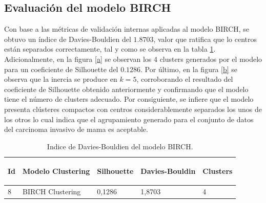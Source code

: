 \subsection{Evaluación del modelo BIRCH}
Con base a las métricas de validación internas aplicadas al modelo BIRCH, se obtuvo un índice de Davies-Bouldien del $1.8703$, valor que ratifica que lo centros están separados correctamente, tal y como se observa en la tabla \ref{Davies-Bouldien}. Adicionalmente, en la figura \ref{a} se observan los 4 clusters generados por el modelo para un coeficiente de Silhouette del $0.1286$. Por último, en la figura \ref{b} se observa que la inercia se produce en $k = 5 $, corroborando el resultado del coeficiente de Silhouette obtenido anteriormente y confirmando que el modelo tiene el número de clusters adecuado. Por consiguiente, se infiere que el modelo presenta clústeres compactos con centros considerablemente separados los unos de los otros lo cual indica que el agrupamiento generado para el conjunto de datos del carcinoma invasivo de mama es aceptable. 

\begin{table}[!htb]
	\footnotesize
	\centering
	\begin{threeparttable}
		\begin{tabular}{p{1cm} p{4cm} p{2.5cm} p{2.5cm} p{1.5cm}} \toprule	
			\begin{center}Id\end{center}
			&\begin{center}Modelo Clustering\end{center}
			&\begin{center}Silhouette\end{center}
			&\begin{center}Davies-Bouldin\end{center}
			&\begin{center}Clusters\end{center}
			\\ \hline 8 & BIRCH Clustering	&	0,1286	&	1,8703	&	4
			\\ \hline
		\end{tabular}
		\caption{Indice de Davies-Bouldien del modelo BIRCH.}
		\label{Davies-Bouldien}
	\end{threeparttable}
\end{table}

